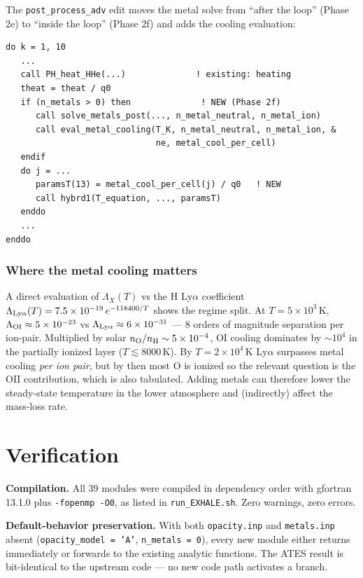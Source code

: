 \documentclass[english,a4paper]{my_memo}
\begin{document}
The \texttt{post\_process\_adv} edit moves the metal solve from
``after the loop'' (Phase 2e) to ``inside the loop'' (Phase 2f) and
adds the cooling evaluation:

\begin{verbatim}
do k = 1, 10
   ...
   call PH_heat_HHe(...)              ! existing: heating
   theat = theat / q0
   if (n_metals > 0) then              ! NEW (Phase 2f)
      call solve_metals_post(..., n_metal_neutral, n_metal_ion)
      call eval_metal_cooling(T_K, n_metal_neutral, n_metal_ion, &
                              ne, metal_cool_per_cell)
   endif
   do j = ...
      paramsT(13) = metal_cool_per_cell(j) / q0   ! NEW
      call hybrd1(T_equation, ..., paramsT)
   enddo
   ...
enddo
\end{verbatim}

\subsubsection*{Where the metal cooling matters}

A direct evaluation of $\Lambda_X(T)$ vs the H Ly$\alpha$ coefficient
$\Lambda_{\rm Ly\alpha}(T) = 7.5\times 10^{-19}\,e^{-118400/T}$
shows the regime split. At $T = 5\times 10^3\,$K,
$\Lambda_{\rm OI} \approx 5\times 10^{-23}$ vs
$\Lambda_{\rm Ly\alpha} \approx 6\times 10^{-31}$ ---
$8$ orders of magnitude separation per ion-pair. Multiplied by solar
$n_{\rm O}/n_{\rm H} \sim 5 \times 10^{-4}$, OI cooling dominates by
$\sim 10^4$ in the partially ionized layer ($T \lesssim 8000\,$K).
By $T = 2 \times 10^4\,$K Ly$\alpha$ surpasses metal cooling
\emph{per ion pair}, but by then most O is ionized so the relevant
question is the OII contribution, which is also tabulated. Adding
metals can therefore lower the steady-state temperature in the lower
atmosphere and (indirectly) affect the mass-loss rate.

\section{Verification}

\textbf{Compilation.} All 39 modules were compiled in dependency order
with gfortran 13.1.0 plus \texttt{-fopenmp -O0}, as listed in
\texttt{run\_EXHALE.sh}. Zero warnings, zero errors.

\textbf{Default-behavior preservation.} With both \texttt{opacity.inp} and
\texttt{metals.inp} absent (\texttt{opacity\_model = 'A'},
\texttt{n\_metals = 0}), every new module either returns immediately or
forwards to the existing analytic functions. The ATES result is
bit-identical to the upstream code --- no new code path activates a branch.
\end{document}
